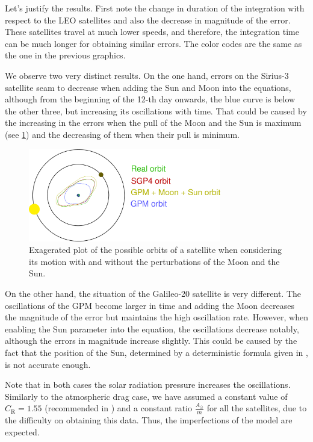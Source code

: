 \documentclass[../main.tex]{subfiles}
\begin{document}
Let's justify the results. First note the change in duration of the integration with respect to the LEO satellites and also the decrease in magnitude of the error. These satellites travel at much lower speeds, and therefore, the integration time can be much longer for obtaining similar errors. The color codes are the same as the one in the previous graphics.

We observe two very distinct results. On the one hand, errors on the Sirius-3 satellite seam to decrease when adding the Sun and Moon into the equations, although from the beginning of the 12-th day onwards, the blue curve is below the other three, but increasing its oscillations with time. That could be caused by the increasing in the errors when the pull of the Moon and the Sun is maximum (see \cref{fig:meo_explanation}) and the decreasing of them when their pull is minimum.

\begin{figure}[ht]
  \centering
  \includegraphics[width=0.75\textwidth]{Images/meo_explanation.pdf}
  \caption{Exagerated plot of the possible orbits of a satellite when considering its motion with and without the perturbations of the Moon and the Sun.}
  \label{fig:meo_explanation}
\end{figure}
On the other hand, the situation of the Galileo-20 satellite is very different. The oscillations of the GPM become larger in time and adding the Moon decreases the magnitude of the error but maintains the high oscillation rate. However, when enabling the Sun parameter into the equation, the oscillations decrease notably, although the errors in magnitude increase slightly. This could be caused by the fact that the position of the Sun, determined by a deterministic formula given in \cite{montenbruck}, is not accurate enough.

Note that in both cases the solar radiation pressure increases the oscillations. Similarly to the atmospheric drag case, we have assumed a constant value of $C_\mathrm{R}=1.55$ (recommended in \cite{montenbruck}) and a constant ratio $\frac{A_\odot}{m}$ for all the satellites, due to the difficulty on obtaining this data. Thus, the imperfections of the model are expected.
\end{document}
